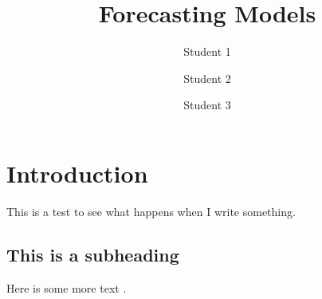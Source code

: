 \documentclass[10pt]{article}
\title{Forecasting Models}
\author{Student 1 \and Student 2 \and Student 3}
\begin{document}
\maketitle

\section{Introduction}
This is a test to see what happens when I write something.

\subsection{This is a subheading}
Here is some more text \cite{mcconnell2009analysis}.











\end{document}

